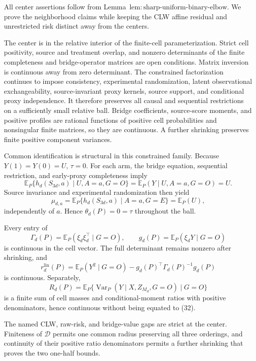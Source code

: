 All center assertions follow from Lemma~\(\mathrm{lem{:}sharp\text{-}uniform\text{-}binary\text{-}elbow}\).  We prove the neighborhood claims while keeping the CLW affine residual and unrestricted risk distinct away from the centers.

The center is in the relative interior of the finite-cell parameterization.  Strict cell positivity, source and treatment overlap, and nonzero determinants of the finite completeness and bridge-operator matrices are open conditions.  Matrix inversion is continuous away from zero determinant.  The constrained factorization continues to impose consistency, experimental randomization, latent observational exchangeability, source-invariant proxy kernels, source support, and conditional proxy independence.  It therefore preserves all causal and sequential restrictions on a sufficiently small relative ball.  Bridge coefficients, source-score moments, and positive profiles are rational functions of positive cell probabilities and nonsingular finite matrices, so they are continuous.  A further shrinking preserves finite positive component variances.

Common identification is structural in this constrained family.  Because \(Y(1)=Y(0)=U\), \(\tau=0\).  For each arm, the bridge equation, sequential restriction, and early-proxy completeness imply
\[
 \mathbb E_P\{h_d(S_{3d},a)\mid U,A=a,G=O\}
 =\mathbb E_P(Y\mid U,A=a,G=O)=U.
\]
Source invariance and experimental randomization then yield
\[
 \mu_{d,a}
 =\mathbb E_P\{h_d(S_{3d},a)\mid A=a,G=E\}
 =\mathbb E_P(U),
\]
independently of \(a\).  Hence \(\theta_d(P)=0=\tau\) throughout the ball.

Every entry of
\[
 \Gamma_d(P)=\mathbb E_P(\xi_d\xi_d^\top\mid G=O),
 \qquad g_d(P)=\mathbb E_P(\xi_dY\mid G=O)
\]
is continuous in the cell vector.  The full determinant remains nonzero after shrinking, and
\[
 r_d^{\mathrm{lin}}(P)=
 \mathbb E_P(Y^2\mid G=O)
 -g_d(P)^\top\Gamma_d(P)^{-1}g_d(P)                       \tag{32}
\]
is continuous.  Separately,
\[
 R_d(P)=\mathbb E_P\{\operatorname{Var}_P(Y\mid X,Z_{M_d},G=O)\mid G=O\}
\]
is a finite sum of cell masses and conditional-moment ratios with positive denominators, hence continuous without being equated to (32).

The named CLW, raw-risk, and bridge-value gaps are strict at the center.  Finiteness of \(\mathcal D\) permits one common radius preserving all three orderings, and continuity of their positive ratio denominators permits a further shrinking that proves the two one-half bounds.

